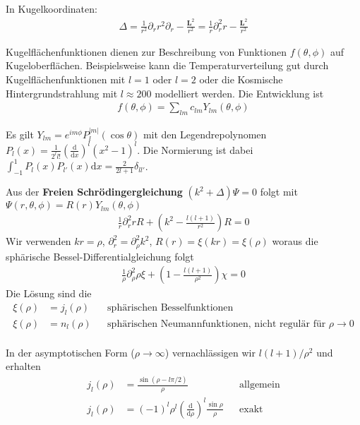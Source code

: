 \documentclass[11pt,a4paper]{report}
\begin{document}
In Kugelkoordinaten:
\begin{align*}
    \Delta = \frac{1}{r^2} \partial_r r^2 \partial_r - \frac{\mathbf{L}^2}{r^2} = \frac{1}{r} \partial_r^2 r - \frac{\mathbf{L}^2}{r^2}
\end{align*}

Kugelflächenfunktionen dienen zur Beschreibung von Funktionen $f(\theta, \phi)$ auf Kugeloberflächen.
Beispielsweise kann die Temperaturverteilung gut durch Kugelflächenfunktionen mit $l=1$ oder $l=2$ oder die Kosmische Hintergrundstrahlung mit $l \approx 200$ modelliert werden.
Die Entwicklung ist 
\begin{align*}
    f(\theta, \phi) = \sum_{l m} c_{l m} Y_{l m}(\theta, \phi)
\end{align*}

Es gilt $Y_{l m} = e^{i m \phi} P_l^{|m|}(\cos \theta)$ mit den Legendrepolynomen $P_l(x) = \frac{1}{2^l l!} \left(\frac{\mathrm{d}}{\mathrm{d}x}\right)^l (x^2 - 1)^l$.
Die Normierung ist dabei $\int_{-1}^1 P_{l}(x) P_{l'}(x) \mathrm{d}x = \frac{2}{2 l + 1} \delta_{l l'}$.

Aus der \textbf{Freien Schrödingergleichung} $(k^2 + \Delta) \Psi = 0$ folgt mit $\Psi(r, \theta, \phi) = R(r) Y_{l m} (\theta, \phi)$
\begin{align*}
    \frac{1}{r} \partial_r^2 r R + \left(k^2 - \frac{l (l+1)}{r^2}\right) R = 0
\end{align*}
Wir verwenden $k r = \rho$, $\partial_r^2 = \partial_\rho^2 k^2$, $R(r) = \xi(kr) = \xi(\rho)$ woraus die sphärische Bessel-Differentialgleichung folgt
\begin{align*}
    \frac{1}{\rho} \partial_\rho^2 \rho \xi + \left(1 - \frac{l (l +1)}{\rho^2} \right) \chi = 0
\end{align*}
Die Lösung sind die 
\begin{align*}
    \xi(\rho) &= j_l(\rho) && \text{sphärischen Besselfunktionen} \\
    \xi(\rho) &= n_l(\rho) && \text{sphärischen Neumannfunktionen, nicht regulär für } \rho\rightarrow 0 \\
\end{align*}

In der asymptotischen Form ($\rho \rightarrow \infty$) vernachlässigen wir $l(l+1)/\rho^2$ und erhalten 
\begin{align*}
    j_l(\rho) &= \frac{\sin (\rho - l \pi/2)}{\rho} && \text{allgemein} \\
    j_l(\rho) &= (-1)^l \rho^l \left(\frac{\mathrm{d}}{\mathrm{d}\rho}\right)^l\frac{\sin \rho}{\rho} && \text{exakt} \\
\end{align*}
\end{document}
